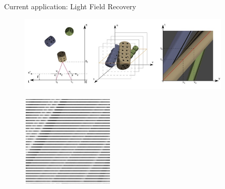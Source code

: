 \begin{frame}{Current application: Light Field Recovery}
\begin{figure}[h!]
\centering
\includegraphics[width=0.9\textwidth]{./Images/dices}
\end{figure}
\pause
\begin{figure}[!tbp]
  \centering
  \begin{minipage}[b]{0.32\textwidth}
    \includegraphics[width=\textwidth]{./Images/EPI_sparse}
  \end{minipage}
	\pause
 \hfill 
  \begin{minipage}[b]{0.32\textwidth}

\end{minipage}
\end{figure}
\end{frame}
